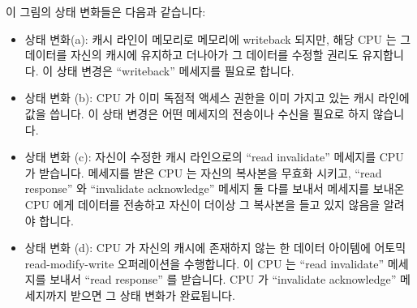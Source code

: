 이 그림의 상태 변화들은 다음과 같습니다:

\begin{itemize}
\item	상태 변화(a):
	캐시 라인이 메모리로 메모리에 writeback 되지만, 해당 CPU 는 그 데이터를
	자신의 캐시에 유지하고 더나아가 그 데이터를 수정할 권리도 유지합니다.
	이 상태 변경은 ``writeback'' 메세지를 필요로 합니다.
\item	상태 변화 (b):
	CPU 가 이미 독점적 액세스 권한을 이미 가지고 있는 캐시 라인에 값을
	씁니다.
	이 상태 변경은 어떤 메세지의 전송이나 수신을 필요로 하지 않습니다.
\item	상태 변화 (c):
	자신이 수정한 캐시 라인으로의 ``read invalidate'' 메세지를 CPU 가
	받습니다.
	메세지를 받은 CPU 는 자신의 복사본을 무효화 시키고, ``read response''
	와 ``invalidate acknowledge'' 메세지 둘 다를 보내서 메세지를 보내온 CPU
	에게 데이터를 전송하고 자신이 더이상 그 복사본을 들고 있지 않음을
	알려야 합니다.
\item	상태 변화 (d):
	CPU 가 자신의 캐시에 존재하지 않는 한 데이터 아이템에 어토믹
	read-modify-write 오퍼레이션을 수행합니다.
	이 CPU 는 ``read invalidate'' 메세지를 보내서 ``read response'' 를
	받습니다.
	CPU 가 ``invalidate acknowledge'' 메세지까지 받으면 그 상태 변화가
	완료됩니다.
\iffalse


\end{itemize}

